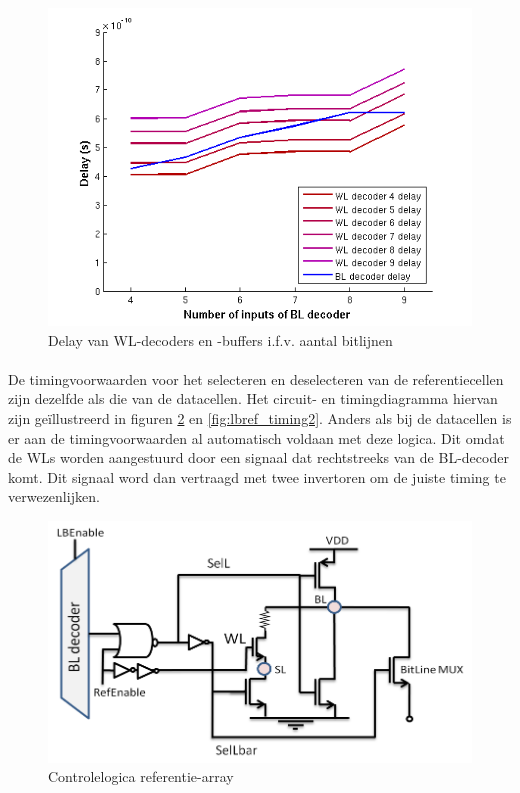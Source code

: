 \begin{figure}[!ht]
  \centering
  \includegraphics[scale=0.6]{../fig/hfdstk-timing-decoder-dep.png}
  \caption[Delay van WL-decoders en -buffers i.f.v. BL-decoders]{Delay van WL-decoders en -buffers i.f.v. aantal bitlijnen}
  \label{fig:decoder_dep}
\end{figure}

\paragraph{}
De timingvoorwaarden voor het selecteren en deselecteren van de referentiecellen zijn dezelfde als die van de datacellen. Het circuit- en timingdiagramma hiervan zijn geïllustreerd in figuren \ref{fig:lbref_timing1} en \ref{fig:lbref_timing2}. Anders als bij de datacellen is er aan de timingvoorwaarden al automatisch voldaan met deze logica. Dit omdat de WLs worden aangestuurd door een signaal dat rechtstreeks van de BL-decoder komt. Dit signaal word dan vertraagd met twee invertoren om de juiste timing te verwezenlijken.


\begin{figure}[!ht]
  \centering
  \includegraphics[scale=0.6]{../fig/hfdstk-timing-lbref1.png}
  \caption[Referentie-array:logica]{Controlelogica referentie-array}
  \label{fig:lbref_timing1}
\end{figure}

